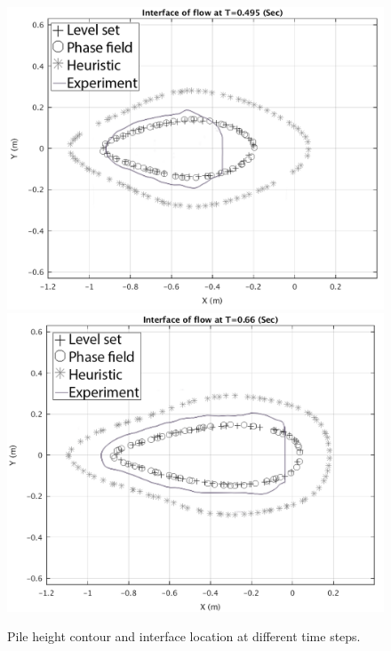 \documentclass[review]{elsarticle}
\begin{document}
\begin{figure}[H]
\begin{minipage}[b]{.5\textwidth}
        \end{minipage}
        \begin{minipage}[b]{.5 \textwidth}
                \centering
                \includegraphics[width=1\textwidth]{IMAGES/interface495.png}
                \includegraphics[width=1\textwidth]{IMAGES/interface660.png}
        \end{minipage}
        \caption{Pile height contour and interface location at different time steps.}
        \label{Pile_height_contour}
\end{figure}
\end{document}
